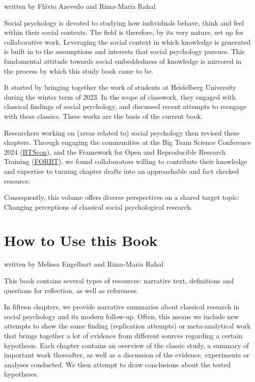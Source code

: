 \documentclass[
  letterpaper,
]{book}
\begin{document}
{written by Flávio Azevedo and Rima-Maria Rahal}

Social psychology is devoted to studying how individuals behave, think
and feel within their social contexts. The field is therefore, by its
very nature, set up for collaborative work. Leveraging the social
context in which knowledge is generated is built in to the assumptions
and interests that social psychology pursues. This fundamental attitude
towards social embeddedness of knowledge is mirrored in the process by
which this study book came to be.

It started by bringing together the work of students at Heidelberg
University during the winter term of 2023. In the scope of classwork,
they engaged with classical findings of social psychology, and discussed
recent attempts to reengage with these classics. These works are the
basis of the current book.

Researchers working on (areas related to) social psychology then revised
these chapters. Through engaging the communities at the Big Team Science
Conference 2024
(\href{https://bigteamscienceconference.github.io}{BTScon}), and the
Framework for Open and Reproducible Research Training
(\href{https://forrt.org}{FORRT}), we found collaborators willing to
contribute their knowledge and expertise to turning chapter drafts into
an approachable and fact checked resource.

Consequently, this volume offers diverse perspectives on a shared target
topic: Changing perceptions of classical social psychological research.


\chapter*{\texorpdfstring{{How to Use this
Book}}{How to Use this Book}}\label{how-to-use-this-book}


{written by Melissa Engelbart and Rima-Maria Rahal}

This book contains several types of resources: narrative text,
definitions and questions for reflection, as well as references.

In fifteen chapters, we provide narrative summaries about classical
research in social psychology and its modern follow-up. Often, this
means we include new attempts to show the same finding (replication
attempts) or meta-analytical work that brings together a lot of evidence
from different sources regarding a certain hypothesis. Each chapter
contains an overview of the classic study, a summary of important work
thereafter, as well as a discussion of the evidence, experiments or
analyses conducted. We then attempt to draw conclusions about the tested
hypotheses.
\end{document}
